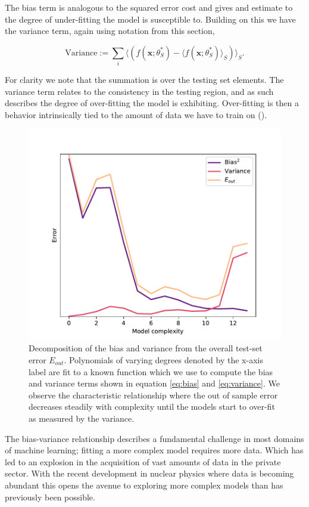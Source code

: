 \noindent The bias term is analogous to the squared error cost and gives and estimate to the degree of under-fitting the model is susceptible to. Building on this we have the variance term, again using notation from this section, 

\begin{equation}\label{eq:variance}
\text{Variance} := \sum_i \langle (f(\mathbf{x}; \theta^*_S) - \langle f(\mathbf{x}; \theta^*_S) \rangle_S)\rangle_S.
\end{equation}

\noindent For clarity we note that the summation is over the testing set elements. The variance term relates to the consistency in the testing region, and as such describes the degree of over-fitting the model is exhibiting. Over-fitting is then a behavior intrinsically tied to the amount of data we have to train on (\cite{Mehta2019}). 

\begin{figure}
\centering
\includegraphics[width=\textwidth]{../figures/bias_var_degree.pdf}
\caption[Bias-variance decomposition ]{Decomposition of the bias and variance from the overall test-set error $E_{out}$. Polynomials of varying degrees denoted by the x-axis label are fit to a known function which we use to compute the bias and variance terms shown in equation \ref{eq:bias} and \ref{eq:variance}. We observe the characteristic relationship where the out of sample error decreases steadily with complexity until the models start to over-fit as measured by the variance.}
\end{figure}

The bias-variance relationship describes a fundamental challenge in most domains of machine learning; fitting a more complex model requires more data. Which has led to an explosion in the acquisition of vast amounts of data in the private sector. With the recent development in nuclear physics where data is becoming abundant this opens the avenue to exploring more complex models than has previously been possible.
